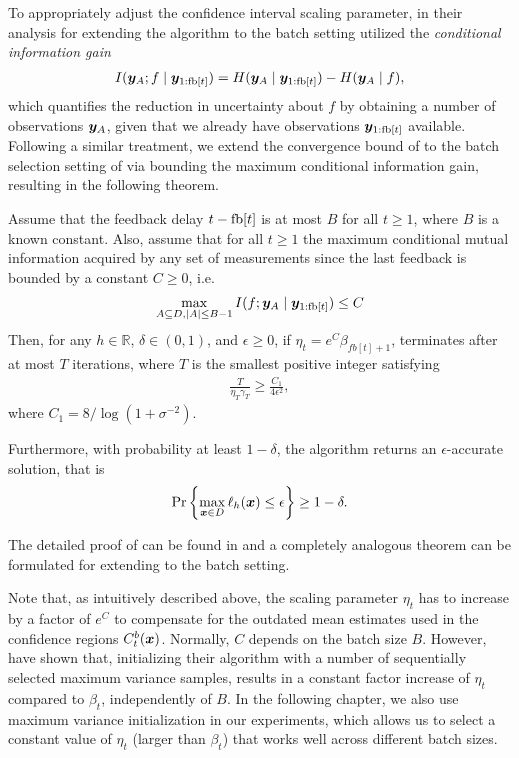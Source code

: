 To appropriately adjust the confidence interval scaling parameter,
in their analysis for extending the \gpucb algorithm to the batch
setting \citet{desautels12} utilized the
\emph{conditional information gain}
\begin{align*}
I(\bm{y}_A; f \mid \bm{y}_{1:\mathop{\mathrm{fb}}[t]}) = H(\bm{y}_A\mid\bm{y}_{1:\mathop{\mathrm{fb}}[t]}) - H(\bm{y}_A\mid f),
\end{align*}
which quantifies the reduction in uncertainty about $f$ by obtaining
a number of observations $\bm{y}_A$, given that we already have observations
$\bm{y}_{1:\mathop{\mathrm{fb}}[t]}$ available.
Following a similar treatment, we extend the convergence bound of
 to the batch selection setting of
\bacl via bounding the maximum conditional information gain, resulting
in the following theorem.

\begin{theorem}
\label{thm:bacl}
Assume that the feedback delay $t - \mathop{\mathrm{fb}}[t]$ is at most $B$ for all $t \geq 1$,
where $B$ is a known constant.
Also, assume that for all $t \geq 1$ the maximum conditional mutual information
acquired by any set of measurements since the last feedback is bounded
by a constant $C \geq 0$, i.e.
\begin{align*}
\max_{A\subseteq D, |A|\leq B-1} I(f; \bm{y}_A \mid \bm{y}_{1:\mathop{\mathrm{fb}}[t]}) \leq C
\end{align*}
Then, for any $h\in\mathbb{R}$, $\delta \in (0, 1)$, and $\epsilon \geq 0$,
if $\eta_t = e^C\beta_{fb[t]+1}$, \bacl terminates after
at most $T$ iterations, where $T$ is the smallest positive integer
satisfying
\begin{align*}
\frac{T}{\eta_T \gamma_T} \geq \frac{C_1}{4\epsilon^2},
\end{align*}
where $C_1 = 8/\log(1 + \sigma^{-2})$.

Furthermore, with probability at least $1-\delta$, the algorithm returns
an $\epsilon$-accurate solution, that is
\begin{align*}
\Pr\left\{\max_{\bm{x}\in D}\ell_h(\bm{x}) \leq \epsilon\right\} \geq 1 - \delta.
\end{align*}
\end{theorem}

The detailed proof of  can be found in
 and a completely analogous theorem can be
formulated for extending \iacl to the batch setting.

Note that, as intuitively described above, the scaling parameter
$\eta_t$ has to increase by a factor of $e^C$ to compensate for the outdated
mean estimates used in the confidence regions $C_t^b(\bm{x})$. Normally, $C$
depends on the batch size $B$. However, \citet{desautels12} have shown that,
initializing their \gpbucb algorithm with a number of sequentially selected
maximum variance samples, results in a constant factor increase of $\eta_t$
compared to $\beta_t$, independently of $B$.
In the following chapter, we also use maximum variance initialization in our
experiments, which allows us to select a constant value of $\eta_t$
(larger than $\beta_t$)
that works well across different batch sizes.